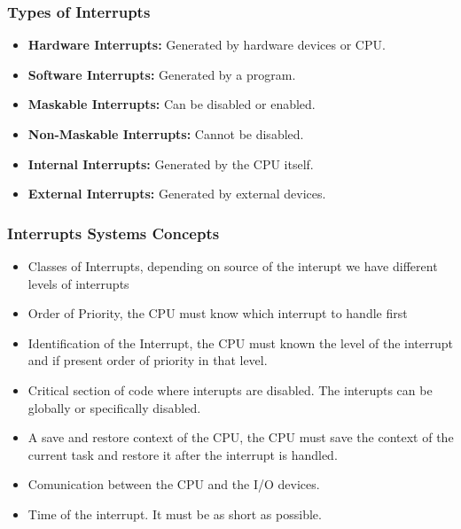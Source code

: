 \begin{frame}
    \frametitle{Types of Interrupts}
        \begin{itemize}
            \item \textbf{Hardware Interrupts:} Generated by hardware devices or CPU.
            \item \textbf{Software Interrupts:} Generated by a program.
            \item \textbf{Maskable Interrupts:} Can be disabled or enabled.
            \item \textbf{Non-Maskable Interrupts:} Cannot be disabled.
            \item \textbf{Internal Interrupts:} Generated by the CPU itself.
            \item \textbf{External Interrupts:} Generated by external devices.
        \end{itemize}
\end{frame}

\begin{frame}
    \frametitle{Interrupts Systems Concepts}
    \begin{itemize}
        \item Classes of Interrupts, depending on source of the interupt we have different levels of interrupts
        \item Order of Priority, the CPU must know which interrupt to handle first
        \item Identification of the Interrupt, the CPU must known the level of the interrupt and if present order of priority in that level.
        \item Critical section of code where interupts are disabled. The interupts can be globally or specifically disabled.
        \item A save and restore context of the CPU, the CPU must save the context of the current task and restore it after the interrupt is handled.
        \item Comunication between the CPU and the I/O devices.
        \item Time of the interrupt. It must be as short as possible.
    \end{itemize}
\end{frame}

